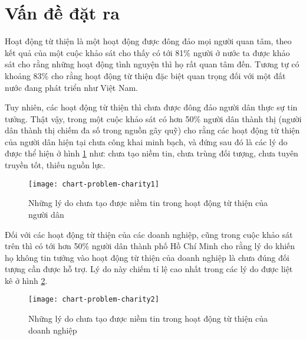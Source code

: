 \documentclass[../main-report.tex]{subfiles}
\begin{document}
\section{Vấn đề đặt ra}
\label{sec:problem}
Hoạt động từ thiện là một hoạt động được đông đảo mọi người quan tâm, theo kết quả của một cuộc khảo sát \cite{vuhongphong_tuthien} cho thấy có tới 81\% người ở nước ta được khảo sát cho rằng những hoạt động tình nguyện thì họ rất quan tâm đến. Tương tự có khoảng 83\% cho rằng hoạt động từ thiện đặc biệt quan trọng đối với một đất nước đang phát triển như Việt Nam.

Tuy nhiên, các hoạt động từ thiện thì chưa được đông đảo người dân thực sự tin tưởng. Thật vậy, trong một cuộc khảo sát \cite{asiafoundation_thuthien} có hơn 50\% người dân thành thị (người dân thành thị chiếm đa số trong nguồn gây quỹ) cho rằng các hoạt động từ thiện của người dân hiện tại chưa công khai minh bạch, và đứng sau đó là các lý do được thể hiện ở hình \ref{fig:chart-problem-charity1} như: chưa tạo niềm tin, chưa trùng đối tượng, chưa tuyên truyền tốt, thiếu nguồn lực.

\begin{figure}[ht!]
\begin{center}
\label{fig:chart-problem-charity1}
\texttt{[image: chart-problem-charity1]}
\caption{Những lý do chưa tạo được niềm tin trong hoạt động từ thiện của người dân}
\end{center}
\end{figure}

Đối với các hoạt động từ thiện của các doanh nghiệp, cũng trong cuộc khảo sát trên thì có tới hơn 50\% người dân thành phố Hồ Chí Minh cho rằng lý do khiến họ không tin tưởng vào hoạt động từ thiện của doanh nghiệp là chưa đúng đối tượng cần được hỗ trợ. Lý do này chiếm tỉ lệ cao nhất trong các lý do được liệt kê ở hình \ref{fig:chart-problem-charity2}.

\begin{figure}[ht!]
\begin{center}
\label{fig:chart-problem-charity2}
\texttt{[image: chart-problem-charity2]}
\caption{Những lý do chưa tạo được niềm tin trong hoạt động từ thiện của doanh nghiệp}
\end{center}
\end{figure}
\end{document}

